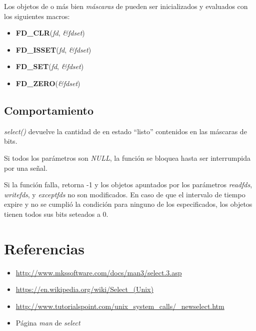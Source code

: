 \documentclass[12pt]{extarticle}
\begin{document}
    Los objetos de \fds o más bien \textit{máscaras} de \fds pueden ser inicializados y evaluados con los siguientes macros:

    \begin{itemize}
        \item \textbf{FD\_CLR}(\textit{fd}, \textit{\&fdset})
        \item \textbf{FD\_ISSET}(\textit{fd}, \textit{\&fdset})
        \item \textbf{FD\_SET}(\textit{fd}, \textit{\&fdset})
        \item \textbf{FD\_ZERO}(\textit{\&fdset})
    \end{itemize}

    \subsection*{Comportamiento}
    \textit{select()} devuelve la cantidad de \fds en estado ``listo'' contenidos en las máscaras de bits.

    Si todos los parámetros son \textit{NULL}, la función se bloquea hasta ser interrumpida por una señal.

    Si la función falla, retorna -1 y los objetos apuntados por los parámetros \textit{readfds}, \textit{writefds}, y \textit{exceptfds} no son modificados. En caso de que el intervalo de tiempo expire y no se cumplió la condición para ninguno de los \fds especificados, los objetos tienen todos sus bits seteados a 0.

    \clearpage

    
    \section{Referencias}
    \begin{itemize}
        \item \url{http://www.mkssoftware.com/docs/man3/select.3.asp}
        \item \url{https://en.wikipedia.org/wiki/Select_(Unix)}
        \item \url{http://www.tutorialspoint.com/unix_system_calls/_newselect.htm}
        \item Página \textit{man} de \textit{select}
    \end{itemize}
\end{document}
